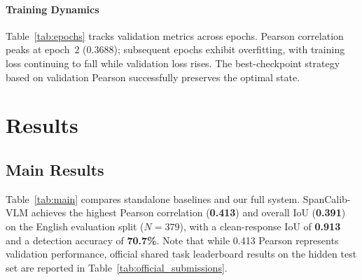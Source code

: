 \documentclass[11pt]{article}
\begin{document}
\paragraph{Training Dynamics}

Table~\ref{tab:epochs} tracks validation metrics across epochs. Pearson correlation peaks at epoch~2 (0.3688); subsequent epochs exhibit overfitting, with training loss continuing to fall while validation loss rises. The best-checkpoint strategy based on validation Pearson successfully preserves the optimal state.
\section{Results}

\subsection{Main Results}

Table~\ref{tab:main} compares standalone baselines and our full system. SpanCalib-VLM achieves the highest Pearson correlation (\textbf{0.413}) and overall IoU (\textbf{0.391}) on the English evaluation split ($N\!=\!379$), with a clean-response IoU of \textbf{0.913} and a detection accuracy of \textbf{70.7\%}. Note that while 0.413 Pearson represents validation performance, official shared task leaderboard results on the hidden test set are reported in Table~\ref{tab:official_submissions}.
\end{document}
